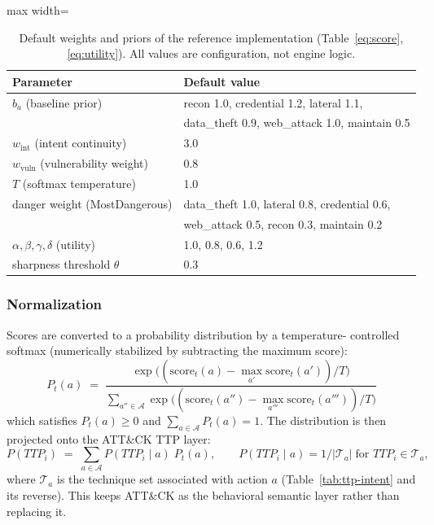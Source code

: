 \documentclass[11pt]{article}
\begin{document}
\begin{table}[ht]
\centering
\begin{adjustbox}{max width=\linewidth}\begin{tabular}{@{}ll@{}}
\toprule
\textbf{Parameter} & \textbf{Default value} \\
\midrule
$b_a$ (baseline prior) & recon 1.0, credential 1.2, lateral 1.1, \\
 & data\_theft 0.9, web\_attack 1.0, maintain 0.5 \\
$w_{\mathrm{int}}$ (intent continuity) & 3.0 \\
$w_{\mathrm{vuln}}$ (vulnerability weight) & 0.8 \\
$T$ (softmax temperature) & 1.0 \\
danger weight (MostDangerous) & data\_theft 1.0, lateral 0.8, credential 0.6, \\
 & web\_attack 0.5, recon 0.3, maintain 0.2 \\
$\alpha,\beta,\gamma,\delta$ (utility) & 1.0, 0.8, 0.6, 1.2 \\
sharpness threshold $\theta$ & 0.3 \\
\bottomrule
\end{tabular}\end{adjustbox}
\caption{Default weights and priors of the reference implementation
(Table~\ref{eq:score}, \ref{eq:utility}). All values are configuration, not
engine logic.}
\label{tab:params}
\end{table}

\subsubsection{Normalization}
\label{sec:softmax}

Scores are converted to a probability distribution by a temperature-
controlled softmax (numerically stabilized by subtracting the maximum
score):
\begin{equation}
\label{eq:softmax}
P_t(a) \;=\; \frac{\exp\!\big((\mathrm{score}_t(a) -
\max_{a'}\mathrm{score}_t(a'))/T\big)}
{\sum_{a'' \in \mathcal{A}} \exp\!\big((\mathrm{score}_t(a'') -
\max_{a'''}\mathrm{score}_t(a'''))/T\big)}
\end{equation}
which satisfies $P_t(a) \geq 0$ and $\sum_{a \in \mathcal{A}} P_t(a) = 1$.
The distribution is then projected onto the ATT\&CK TTP layer:
\begin{equation}
\label{eq:ttp-proj}
P(\mathit{TTP}_i) \;=\; \sum_{a \in \mathcal{A}}
P(\mathit{TTP}_i \mid a)\; P_t(a),
\qquad
P(\mathit{TTP}_i \mid a) = 1/|\mathcal{T}_a| \;\text{for } \mathit{TTP}_i
\in \mathcal{T}_a,
\end{equation}
where $\mathcal{T}_a$ is the technique set associated with action $a$
(Table~\ref{tab:ttp-intent} and its reverse). This keeps ATT\&CK as the
behavioral semantic layer rather than replacing it.
\end{document}

